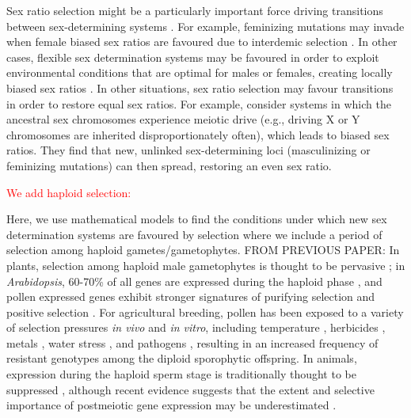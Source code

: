 \documentclass[12pt]{article}
\begin{document}
Sex ratio selection might be a particularly important force driving transitions between sex-determining systems \citep[Chapter 7]{Beukeboom:2014vb}. 
For example, feminizing mutations may invade when female biased sex ratios are favoured due to interdemic selection \citep{Wilson:1981vm,Vuillleumier:2007bh}.
In other cases, flexible sex determination systems may be favoured in order to exploit environmental conditions that are optimal for males or females, creating locally biased sex ratios \citep{Charnov:1977tx,Werren:1984tl,Pen:2010kk}. 
In other situations, sex ratio selection may favour transitions in order to restore equal sex ratios. 
For example, \citet{Kozielska:2010vm} consider systems in which the ancestral sex chromosomes experience meiotic drive (e.g., driving X or Y chromosomes are inherited disproportionately often), which leads to biased sex ratios. They find that new, unlinked sex-determining loci (masculinizing or feminizing mutations) can then spread, restoring an even sex ratio. 

\noindent
\textcolor{red}{We add haploid selection:}

Here, we use mathematical models to find the conditions under which new sex determination systems are favoured by selection where we include a period of selection among haploid gametes/gametophytes. 
{\color{blue}
FROM PREVIOUS PAPER:
In plants, selection among haploid male gametophytes is thought to be pervasive \cite{SKOGSMYR:2002ce,Moore:2011jt,Marshall:2016fe}; in \textit{Arabidopsis}, 60-70\% of all genes are expressed during the haploid phase \cite{Borg:2009jpa}, and pollen expressed genes exhibit stronger signatures of purifying selection and positive selection \cite{Arunkumar:2013iq,Gossmann:2014dua}.
For agricultural breeding, pollen has been exposed to a variety of selection pressures \textit{in vivo} and \textit{in vitro}, including temperature \cite{Hedhly:2004iv,Clarke:2004ir}, herbicides \cite{Frascaroli:2001ee}, metals \cite{Searcy:1985vt}, water stress \cite{Ravikumar:2003uo}, and pathogens \cite{Ravikumar:2012ej}, resulting in an increased frequency of resistant genotypes among the diploid sporophytic offspring. 
In animals, expression during the haploid sperm stage is traditionally thought to be suppressed \cite{Hecht:1998hz}, although recent evidence suggests that the extent and selective importance of postmeiotic gene expression may be underestimated \cite{Zheng:2001fi,JOSEPH:2004haa,Vibranovski:2010et,Immler:2014im}. 
}
\end{document}

